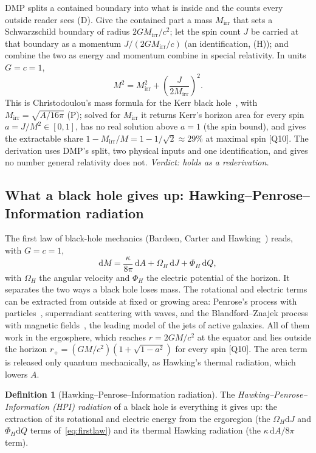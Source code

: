 \documentclass[11pt,a4paper]{article}
\theoremstyle{definition}
\newtheorem{definition}{Definition}
\theoremstyle{remark}
\newcommand{\chk}[1]{\textsf{[#1]}}
\newcommand{\tagD}{\textsf{(D)}}
\newcommand{\tagH}{\textsf{(H)}}
\newcommand{\tagP}{\textsf{(P)}}
\newcommand{\dd}{\mathrm{d}}
\theoremstyle{definition}
\begin{document}
DMP splits a contained boundary into what is inside and the counts every outside reader sees \tagD. Give the contained part a mass
$M_{\text{irr}}$ that sets a Schwarzschild boundary of radius $2GM_{\text{irr}}/c^2$; let the spin count $J$ be carried at that boundary as
a momentum $J/(2GM_{\text{irr}}/c)$ (an identification, \tagH); and combine the two as energy and momentum combine in special relativity. In
units $G=c=1$,
\begin{equation}\label{eq:christo}
M^2=M_{\text{irr}}^2+\left(\frac{J}{2M_{\text{irr}}}\right)^2 .
\end{equation}
This is Christodoulou's mass formula for the Kerr black hole~\cite{christodoulou}, with $M_{\text{irr}}=\sqrt{A/16\pi}$ \tagP; solved for
$M_{\text{irr}}$ it returns Kerr's horizon area for every spin $a=J/M^2\in[0,1]$, has no real solution above $a=1$ (the spin bound), and
gives the extractable share $1-M_{\text{irr}}/M=1-1/\sqrt2\approx29\%$ at maximal spin \chk{Q10}. The derivation uses DMP's split, two
physical inputs and one identification, and gives no number general relativity does not. \emph{Verdict: holds as a rederivation.}

\subsection{What a black hole gives up: Hawking--Penrose--Information radiation}

The first law of black-hole mechanics (Bardeen, Carter and Hawking~\cite{bch}) reads, with $G=c=1$,
\begin{equation}\label{eq:firstlaw}
\dd M=\frac{\kappa}{8\pi}\,\dd A+\Omega_H\,\dd J+\Phi_H\,\dd Q ,
\end{equation}
with $\Omega_H$ the angular velocity and $\Phi_H$ the electric potential of the horizon. It separates the two ways a black hole loses mass.
The rotational and electric terms can be extracted from outside at fixed or growing area: Penrose's process with particles~\cite{penrose69},
superradiant scattering with waves, and the Blandford--Znajek process with magnetic fields~\cite{bz}, the leading model of the jets of
active galaxies. All of them work in the ergosphere, which reaches $r=2GM/c^2$ at the equator and lies outside the horizon
$r_+=(GM/c^2)(1+\sqrt{1-a^2})$ for every spin \chk{Q10}. The area term is released only quantum mechanically, as Hawking's thermal
radiation, which lowers $A$.

\begin{definition}[Hawking--Penrose--Information radiation]
The \emph{Hawking--Penrose--Information (HPI) radiation} of a black hole is everything it gives up: the extraction of its rotational and
electric energy from the ergoregion (the $\Omega_H\dd J$ and $\Phi_H\dd Q$ terms of~\eqref{eq:firstlaw}) and its thermal Hawking radiation (the
$\kappa\,\dd A/8\pi$ term).
\end{definition}
\end{document}
